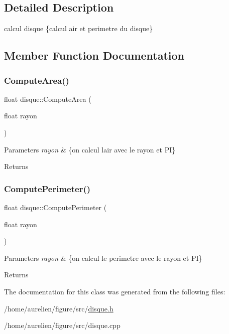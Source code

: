 \subsection{Detailed Description}
calcul disque \{calcul air et perimetre du disque\} 

\subsection{Member Function Documentation}
\mbox{\label{classdisque_a144bd3137c6cd183eba6792a4553764b}} 
\subsubsection{\texorpdfstring{Compute\+Area()}{ComputeArea()}}
{\footnotesize\ttfamily float disque\+::\+Compute\+Area (\begin{DoxyParamCaption}\item[{float}]{rayon }\end{DoxyParamCaption})}


\begin{DoxyParams}{Parameters}
{\em rayon} & \{on calcul l\textquotesingle{}air avec le rayon et PI\} \\
\hline
\end{DoxyParams}
\begin{DoxyReturn}{Returns}

\end{DoxyReturn}
\mbox{\label{classdisque_ac26d8f8f1b149a7214f347ae9655410a}} 
\subsubsection{\texorpdfstring{Compute\+Perimeter()}{ComputePerimeter()}}
{\footnotesize\ttfamily float disque\+::\+Compute\+Perimeter (\begin{DoxyParamCaption}\item[{float}]{rayon }\end{DoxyParamCaption})}


\begin{DoxyParams}{Parameters}
{\em rayon} & \{on calcul le perimetre avec le rayon et PI\} \\
\hline
\end{DoxyParams}
\begin{DoxyReturn}{Returns}

\end{DoxyReturn}


The documentation for this class was generated from the following files\+:\begin{DoxyCompactItemize}
\item 
/home/aurelien/figure/src/\hyperlink{disque_8h}{disque.\+h}\item 
/home/aurelien/figure/src/disque.\+cpp\end{DoxyCompactItemize}
